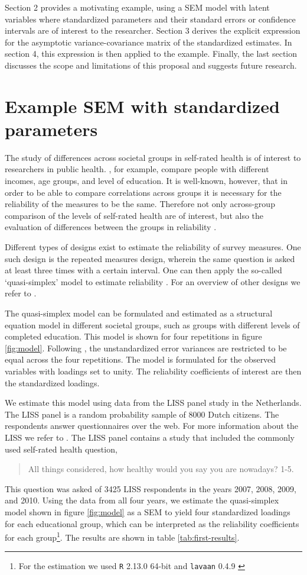 \documentclass[a4paper, 11pt]{article}
\newcommand{\0}{\boldsymbol{0}}
\newcommand{\R}{\texttt{R} 2.13.0 64-bit \citep{R}\;}
\newcommand{\lavaan}{\texttt{lavaan} 0.4.9 \citep{lavaan}\;}
\begin{document}
Section 2 provides a motivating example, using a SEM model with latent
variables where standardized parameters and their standard errors or confidence
intervals are of interest to the researcher.
Section 3 derives the explicit expression for the asymptotic variance-covariance matrix of the standardized estimates. In section 4, this expression is then applied to the example. Finally, the last section discusses the scope and limitations of this proposal and suggests future research.


\section{Example SEM with standardized parameters} 


The study of differences across societal groups in self-rated health is of interest to researchers in public health.   \cite{mackenbach}, 
for example, compare people with different incomes, age groups, and level of education.
It is well-known, however, that in order to be able to compare correlations across groups it is necessary for the reliability of 
the measures to be the same. Therefore not only across-group comparison of the levels of self-rated health are of interest, 
but also the evaluation of differences between the groups in reliability \citep{finnish study}. 

Different types of designs exist to estimate the reliability of survey measures. One such design is the repeated measures design, wherein the
same question is asked at least three times with a certain interval. One can then apply the so-called `quasi-simplex' model to estimate
reliability \cite{heise,wiley}. For an overview of other designs we refer to \cite{alwin}. 

The quasi-simplex model can be formulated and estimated as a structural equation model in different societal groups, such as groups with different levels of completed education. This model is shown for four repetitions in figure 
\ref{fig:model}. Following \cite{wiley}, the unstandardized error variances are restricted to be equal across the four repetitions. 
The model is formulated for the observed variables with loadings set to unity. The reliability coefficients of interest are then the standardized loadings.

We estimate this model using data from the LISS panel study in the Netherlands. The LISS panel is a random probability sample 
of 8000 Dutch citizens. The respondents answer questionnaires over the web. For more information about the LISS we refer to \cite{das}.
The LISS panel contains a study that included the commonly used self-rated health question,
\begin{quote}
	All things considered, how healthy would you say you are nowadays?
	1-5.
\end{quote}
This question was asked of 3425 LISS respondents in the years 2007, 2008, 2009, and 2010. Using the data from all four years, we estimate the 
quasi-simplex model shown in figure \ref{fig:model} as a SEM 
to yield four standardized loadings for each educational group, which can be interpreted as the reliability coefficients for each group\footnote{For the estimation we used
\R and \lavaan}. The results are shown in table \ref{tab:first-results}.
\end{document}
